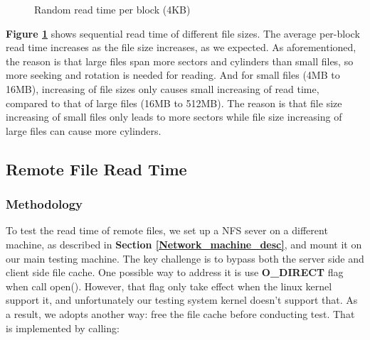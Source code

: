 \begin{figure}[ht]
    \centering
    \caption{Random read time per block (4KB)}
    \label{rand_read_time}
\end{figure}

\textbf{Figure \ref{rand_read_time}} shows sequential read time of different file sizes. The average per-block read time increases as the file size increases, as we expected. As aforementioned, the reason is that large files span more sectors and cylinders than small files, so more seeking and rotation is needed for reading. And for small files (4MB to 16MB), increasing of file sizes only causes small increasing of read time, compared to that of large files (16MB to 512MB).
The reason is that file size increasing of small files only leads to more sectors while file size increasing of large files can cause more cylinders.

\subsection{Remote File Read Time}

\subsubsection{Methodology}
To test the read time of remote files, we set up a NFS sever on a different machine, as described in \textbf{Section \ref{Network_machine_desc}}, and mount it on our main testing machine. The key challenge is to bypass both the server side and client side file cache. One possible way to address it is use \textbf{O\_DIRECT} flag when call open(). However, that flag only take effect when the linux kernel support it, and unfortunately our testing system kernel doesn't support that. As a result,
we adopts another way: free the file cache before conducting test. That is implemented by calling:

